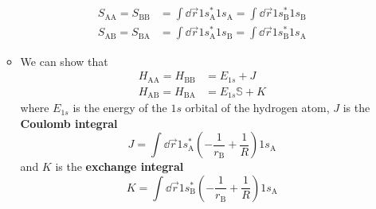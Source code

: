 \documentclass[../notes.tex]{subfiles}
\begin{document}
\begin{itemize}
\begin{itemize}
\begin{align*}
            S_{\text{A}\text{A}} = S_{\text{B}\text{B}} &= \int\dd{\vec{r}}1s_\text{A}^*1s_\text{A} = \int\dd{\vec{r}}1s_\text{B}^*1s_\text{B}\\
            S_{\text{A}\text{B}} = S_{\text{B}\text{A}} &= \int\dd{\vec{r}}1s_\text{A}^*1s_\text{B} = \int\dd{\vec{r}}1s_\text{B}^*1s_\text{A}
        \end{align*}
        \item We can show that
        \begin{align*}
            H_{\text{A}\text{A}} = H_{\text{B}\text{B}} &= E_{1s}+J\\
            H_{\text{A}\text{B}} = H_{\text{B}\text{A}} &= E_{1s}\mathbb{S}+K
        \end{align*}
        where $E_{1s}$ is the energy of the $1s$ orbital of the hydrogen atom, $J$ is the \textbf{Coulomb integral}
        \begin{equation*}
            J = \int\dd{\vec{r}}1s_\text{A}^*\left( -\frac{1}{r_\text{B}}+\frac{1}{R} \right)1s_\text{A}
        \end{equation*}
        and $K$ is the \textbf{exchange integral}
        \begin{equation*}
            K = \int\dd{\vec{r}}1s_\text{B}^*\left( -\frac{1}{r_\text{B}}+\frac{1}{R} \right)1s_\text{A}
        \end{equation*}
    \end{itemize}
\end{itemize}
\end{document}
